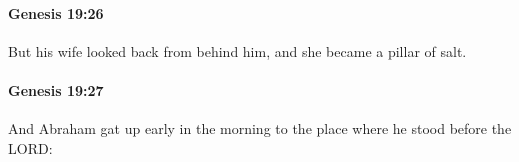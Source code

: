 		\paragraph{Genesis 19:26} %
			\label{GENESIS-19-26}

			But his wife looked back from behind him, and she became a pillar of salt.


		\paragraph{Genesis 19:27} %
			\label{GENESIS-19-27}

			And Abraham gat up early in the morning to the place where he stood before the LORD:


